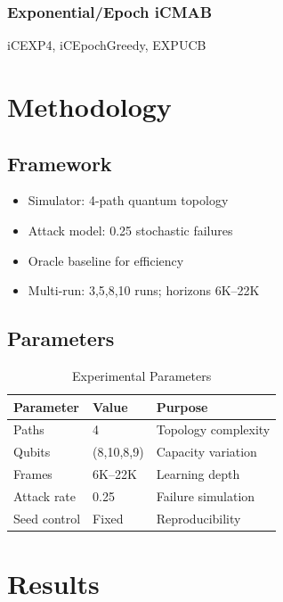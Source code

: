 \documentclass[12pt,a4paper]{article}
\begin{document}
\subsubsection{Exponential/Epoch iCMAB}
iCEXP4, iCEpochGreedy, EXPUCB

\section{Methodology}
\subsection{Framework}
\begin{itemize}
\item Simulator: 4-path quantum topology
\item Attack model: 0.25 stochastic failures
\item Oracle baseline for efficiency
\item Multi-run: 3,5,8,10 runs; horizons 6K–22K
\end{itemize}

\subsection{Parameters}
\begin{table}[H]
\centering
\caption{Experimental Parameters}
\begin{tabular}{@{}lll@{}}
\toprule
Parameter & Value & Purpose \\
\midrule
Paths & 4 & Topology complexity \\
Qubits & (8,10,8,9) & Capacity variation \\
Frames & 6K–22K & Learning depth \\
Attack rate & 0.25 & Failure simulation \\
Seed control & Fixed & Reproducibility \\
\bottomrule
\end{tabular}
\end{table}

\section{Results}
\end{document}
